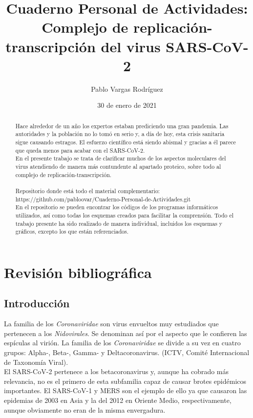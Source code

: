 \documentclass[a4paper,11pt]{report}
\begin{document}
	\title{Cuaderno Personal de Actividades: Complejo de replicación-transcripción del virus SARS-CoV-2}
	\author{Pablo Vargas Rodríguez}
	\date{30 de enero de 2021}
	\maketitle
	\begin{abstract}
		Hace alrededor de un año los expertos estaban prediciendo una gran pandemia. Las autoridades y la población no lo tomó en serio y, a día de hoy, esta crisis sanitaria sigue causando estragos. El esfuerzo científico está siendo abismal y gracias a él parece que queda menos para acabar con el SARS-CoV-2.
		\\ En el presente trabajo se trata de clarificar muchos de los aspectos moleculares del virus atendiendo de manera más contundente al apartado proteico, sobre todo al complejo de replicación-transcripción. 
		\\ \\Repositorio donde está todo el material complementario: \\ https://github.com/pabloovar/Cuaderno-Personal-de-Actividades.git \\
		En el repositorio se pueden encontrar los códigos de los programas informáticos utilizados, así como todas los esquemas creados para facilitar la comprensión. Todo el trabajo presente ha sido realizado de manera individual, incluidos los esquemas y gráficos, excepto los que están referenciados.
	\end{abstract}
 \tableofcontents
 \chapter{Revisión bibliográfica}
 \section{Introducción}
 La familia de los \textit{Coronaviridae} son virus envueltos muy estudiados que pertenecen a los \textit{Nidovirales}. Se denominan así por el aspecto que le confieren las espículas al virión. La familia de los \textit{Coronaviridae} se divide a su vez en cuatro grupos: Alpha-, Beta-, Gamma- y Deltacoronavirus. (ICTV, Comité Internacional de Taxonomía Viral).\\
 
 
  El SARS-CoV-2 pertenece a los betacoronavirus y, aunque ha cobrado más relevancia, no es el primero de esta subfamilia capaz de causar brotes epidémicos importantes. El SARS-CoV-1 y MERS son el ejemplo de ello ya que causaron las epidemias de 2003 en Asia y la del 2012 en Oriente Medio, respectivamente, aunque obviamente no eran de la misma envergadura. \\
 
\end{document}
